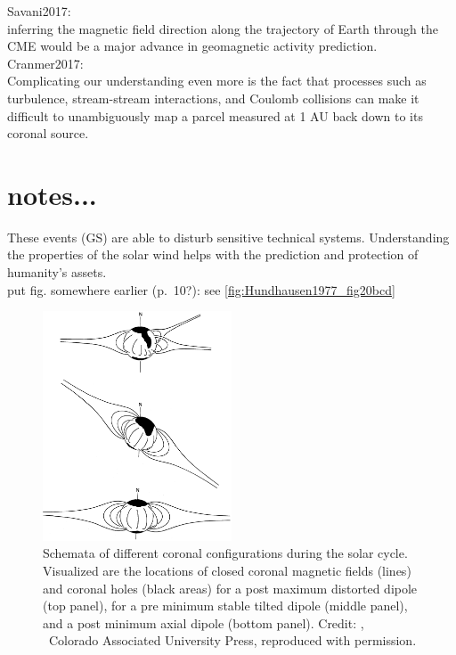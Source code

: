 Savani2017:\\
inferring the magnetic field direction along the trajectory of Earth through the CME would be a major advance in geomagnetic activity prediction.\\


Cranmer2017:\\
Complicating our understanding even more is the fact that processes such as turbulence, stream-stream interactions, and Coulomb collisions can make it difficult to unambiguously map a parcel measured at 1 AU back down to its coronal source.\\



\section{notes...}

These events (GS) are able to disturb sensitive technical systems. Understanding the properties of the solar wind helps with the prediction and protection of humanity's assets.\\

put fig. somewhere earlier (p.~10?): see \autoref{fig:Hundhausen1977_fig20bcd}\\
\begin{figure}[htb]
	\centering
	\includegraphics[width=0.5\textwidth]{figures_of_others/images/Hundhausen1977_fig20bcd.png}
	\caption[Credit: {\citep[Fig.~20, panels (b--d)]{Hundhausen1977}}, \textcopyright~Colorado Associated University Press, reproduced with permission.]
	{Schemata of different coronal configurations during the solar cycle. Visualized are the locations of closed coronal magnetic fields (lines) and coronal holes (black areas) for a post maximum distorted dipole (top panel), for a pre minimum stable tilted dipole (middle panel), and a post minimum axial dipole (bottom panel). Credit: {\citep[Fig.~20, panels (b--d)]{Hundhausen1977}}, \textcopyright~Colorado Associated University Press, reproduced with permission.}
	\label{fig:Hundhausen1977_fig20bcd}
\end{figure}


